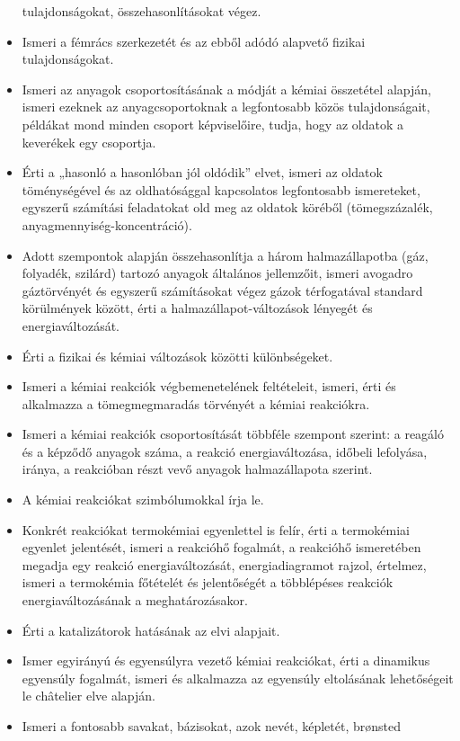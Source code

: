 \begin{itemize}
  tulajdonságokat, összehasonlításokat végez.
\item
  Ismeri a fémrács szerkezetét és az ebből adódó alapvető fizikai
  tulajdonságokat.
\item
  Ismeri az anyagok csoportosításának a módját a kémiai összetétel
  alapján, ismeri ezeknek az anyagcsoportoknak a legfontosabb közös
  tulajdonságait, példákat mond minden csoport képviselőire, tudja, hogy
  az oldatok a keverékek egy csoportja.
\item
  Érti a „hasonló a hasonlóban jól oldódik'' elvet, ismeri az oldatok
  töménységével és az oldhatósággal kapcsolatos legfontosabb
  ismereteket, egyszerű számítási feladatokat old meg az oldatok köréből
  (tömegszázalék, anyagmennyiség-koncentráció).
\item
  Adott szempontok alapján összehasonlítja a három halmazállapotba (gáz,
  folyadék, szilárd) tartozó anyagok általános jellemzőit, ismeri
  avogadro gáztörvényét és egyszerű számításokat végez gázok
  térfogatával standard körülmények között, érti a
  halmazállapot-változások lényegét és energiaváltozását.
\item
  Érti a fizikai és kémiai változások közötti különbségeket.
\item
  Ismeri a kémiai reakciók végbemenetelének feltételeit, ismeri, érti és
  alkalmazza a tömegmegmaradás törvényét a kémiai reakciókra.
\item
  Ismeri a kémiai reakciók csoportosítását többféle szempont szerint: a
  reagáló és a képződő anyagok száma, a reakció energiaváltozása,
  időbeli lefolyása, iránya, a reakcióban részt vevő anyagok
  halmazállapota szerint.
\item
  A kémiai reakciókat szimbólumokkal írja le.
\item
  Konkrét reakciókat termokémiai egyenlettel is felír, érti a
  termokémiai egyenlet jelentését, ismeri a reakcióhő fogalmát, a
  reakcióhő ismeretében megadja egy reakció energiaváltozását,
  energiadiagramot rajzol, értelmez, ismeri a termokémia főtételét és
  jelentőségét a többlépéses reakciók energiaváltozásának a
  meghatározásakor.
\item
  Érti a katalizátorok hatásának az elvi alapjait.
\item
  Ismer egyirányú és egyensúlyra vezető kémiai reakciókat, érti a
  dinamikus egyensúly fogalmát, ismeri és alkalmazza az egyensúly
  eltolásának lehetőségeit le châtelier elve alapján.
\item
  Ismeri a fontosabb savakat, bázisokat, azok nevét, képletét, brønsted

\end{itemize}
